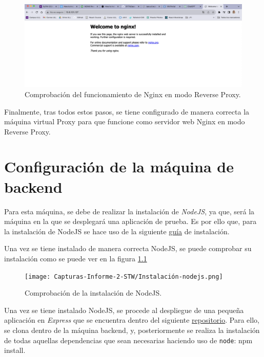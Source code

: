 \documentclass{report}
\begin{document}
  \begin{figure}[H]
    \centering
    \includegraphics[scale=0.6]{Capturas-Informe-2-STW/Funcionamiento-de-ngingx.png}
    \caption{Comprobación del funcionamiento de Nginx en modo Reverse Proxy.}
    \label{fig:Comprobación-Reverse-Proxy}
  \end{figure}

  Finalmente, tras todos estos pasos, se tiene configurado de manera correcta la máquina virtual Proxy para que funcione como servidor web Nginx en modo Reverse Proxy.

  \chapter{Configuración de la máquina de backend}
  Para esta máquina, se debe de realizar la instalación de \emph{NodeJS}, ya que, será la máquina en la que se desplegará una aplicación de prueba. Es por ello que, para la instalación de NodeJS se hace uso de la siguiente \href{https://linuxconfig.org/how-to-install-nodejs-on-debian-9-stretch-linux}{guía} de instalación.

  Una vez se tiene instalado de manera correcta NodeJS, se puede comprobar su instalación como se puede ver en la figura \ref{fig:Comprobación-NodeJS}

  \begin{figure}[H]
    \centering
    \texttt{[image: Capturas-Informe-2-STW/Instalación-nodejs.png]}
    \caption{Comprobación de la instalación de NodeJS.}
    \label{fig:Comprobación-NodeJS}
  \end{figure}

  Una vez se tiene instalado NodeJS, se procede al despliegue de una pequeña aplicación en \emph{Express} que se encuentra dentro del siguiente \href{https://github.com/crguezl/express-start}{repositorio}. Para ello, se clona dentro de la máquina backend, y, posteriormente se realiza la instalación de todas aquellas dependencias que sean necesarias haciendo uso de \verb|node|: npm install.
\end{document}
